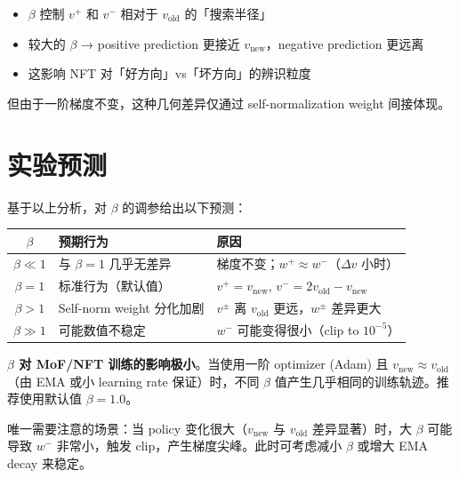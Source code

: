 \documentclass[11pt,a4paper]{article}
\theoremstyle{definition}
\begin{document}
\begin{itemize}
\item $\beta$ 控制 $v^+$ 和 $v^-$ 相对于 $v_{\text{old}}$ 的「搜索半径」
\item 较大的 $\beta$ → positive prediction 更接近 $v_{\text{new}}$，negative prediction 更远离
\item 这影响 NFT 对「好方向」vs「坏方向」的辨识粒度
\end{itemize}

但由于一阶梯度不变，这种几何差异仅通过 self-normalization weight 间接体现。

\section{实验预测}
\label{sec:predictions}

基于以上分析，对 $\beta$ 的调参给出以下预测：

\begin{center}
\renewcommand{\arraystretch}{1.4}
\begin{tabular}{cll}
\toprule
$\beta$ & \textbf{预期行为} & \textbf{原因} \\
\midrule
$\beta \ll 1$ & 与 $\beta=1$ 几乎无差异 & 梯度不变；$w^+ \approx w^-$（$\Delta v$ 小时） \\
$\beta = 1$ & 标准行为（默认值） & $v^+ = v_{\text{new}}$, $v^- = 2v_{\text{old}} - v_{\text{new}}$ \\
$\beta > 1$ & Self-norm weight 分化加剧 & $v^{\pm}$ 离 $v_{\text{old}}$ 更远，$w^{\pm}$ 差异更大 \\
$\beta \gg 1$ & 可能数值不稳定 & $w^-$ 可能变得很小（clip to $10^{-5}$）\\
\bottomrule
\end{tabular}
\end{center}

\begin{tcolorbox}[title=实践结论]
\textbf{$\beta$ 对 MoF/NFT 训练的影响极小}。当使用一阶 optimizer (Adam) 且 $v_{\text{new}} \approx v_{\text{old}}$（由 EMA 或小 learning rate 保证）时，不同 $\beta$ 值产生几乎相同的训练轨迹。推荐使用默认值 $\beta = 1.0$。

唯一需要注意的场景：当 policy 变化很大（$v_{\text{new}}$ 与 $v_{\text{old}}$ 差异显著）时，大 $\beta$ 可能导致 $w^-$ 非常小，触发 clip，产生梯度尖峰。此时可考虑减小 $\beta$ 或增大 EMA decay 来稳定。
\end{tcolorbox}
\end{document}
